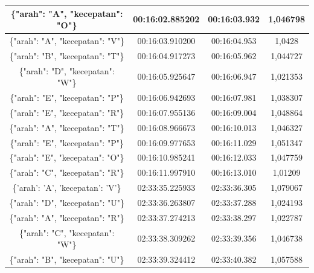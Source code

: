 \begin{table}[htpb]
\begin{tabular}{|ccc|c|}
  \multicolumn{1}{|c|}{\{"arah": "A", "kecepatan": "O"\}} & \multicolumn{1}{c|}{00:16:02.885202} & 00:16:03.932       & 1,046798    \\ \hline
  \multicolumn{1}{|c|}{\{"arah": "A", "kecepatan": "V"\}} & \multicolumn{1}{c|}{00:16:03.910200} & 00:16:04.953       & 1,0428      \\ \hline
  \multicolumn{1}{|c|}{\{"arah": "B", "kecepatan": "T"\}} & \multicolumn{1}{c|}{00:16:04.917273} & 00:16:05.962       & 1,044727    \\ \hline
  \multicolumn{1}{|c|}{\{"arah": "D", "kecepatan": "W"\}} & \multicolumn{1}{c|}{00:16:05.925647} & 00:16:06.947       & 1,021353    \\ \hline
  \multicolumn{1}{|c|}{\{"arah": "E", "kecepatan": "P"\}} & \multicolumn{1}{c|}{00:16:06.942693} & 00:16:07.981       & 1,038307    \\ \hline
  \multicolumn{1}{|c|}{\{"arah": "E", "kecepatan": "R"\}} & \multicolumn{1}{c|}{00:16:07.955136} & 00:16:09.004       & 1,048864    \\ \hline
  \multicolumn{1}{|c|}{\{"arah": "A", "kecepatan": "T"\}} & \multicolumn{1}{c|}{00:16:08.966673} & 00:16:10.013       & 1,046327    \\ \hline
  \multicolumn{1}{|c|}{\{"arah": "E", "kecepatan": "P"\}} & \multicolumn{1}{c|}{00:16:09.977653} & 00:16:11.029       & 1,051347    \\ \hline
  \multicolumn{1}{|c|}{\{"arah": "E", "kecepatan": "O"\}} & \multicolumn{1}{c|}{00:16:10.985241} & 00:16:12.033       & 1,047759    \\ \hline
  \multicolumn{1}{|c|}{\{"arah": "C", "kecepatan": "R"\}} & \multicolumn{1}{c|}{00:16:11.997910} & 00:16:13.010       & 1,01209     \\ \hline
  \multicolumn{1}{|c|}{\{'arah': 'A', 'kecepatan': 'V'\}} & \multicolumn{1}{c|}{02:33:35.225933} & 02:33:36.305       & 1,079067    \\ \hline
  \multicolumn{1}{|c|}{\{"arah": "D", "kecepatan": "U"\}} & \multicolumn{1}{c|}{02:33:36.263807} & 02:33:37.288       & 1,024193    \\ \hline
  \multicolumn{1}{|c|}{\{"arah": "A", "kecepatan": "R"\}} & \multicolumn{1}{c|}{02:33:37.274213} & 02:33:38.297       & 1,022787    \\ \hline
  \multicolumn{1}{|c|}{\{"arah": "C", "kecepatan": "W"\}} & \multicolumn{1}{c|}{02:33:38.309262} & 02:33:39.356       & 1,046738    \\ \hline
  \multicolumn{1}{|c|}{\{"arah": "B", "kecepatan": "U"\}} & \multicolumn{1}{c|}{02:33:39.324412} & 02:33:40.382       & 1,057588    \\ \hline

\end{tabular}
\end{table}
